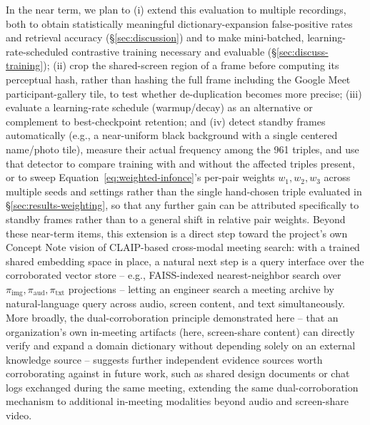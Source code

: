 ﻿\documentclass[twocolumn]{article}
\begin{document}
In the near term, we plan to (i) extend this evaluation to multiple recordings, both to obtain
statistically meaningful dictionary-expansion false-positive rates and retrieval accuracy
(\S\ref{sec:discussion}) and to make mini-batched, learning-rate-scheduled contrastive training
necessary and evaluable (\S\ref{sec:discuss-training}); (ii) crop the shared-screen region of a
frame before computing its perceptual hash, rather than hashing the full frame including the
Google Meet participant-gallery tile, to test whether de-duplication becomes more precise;
(iii) evaluate a learning-rate schedule (warmup/decay) as an alternative or complement to
best-checkpoint retention; and (iv) detect standby frames automatically (e.g., a near-uniform
black background with a single centered name/photo tile), measure their actual frequency among the
961 triples, and use that detector to compare training with and without the affected triples
present, or to sweep Equation~\ref{eq:weighted-infonce}'s per-pair weights $w_1, w_2, w_3$ across
multiple seeds and settings rather than the single hand-chosen triple evaluated in
\S\ref{sec:results-weighting}, so that any further gain can be attributed specifically to standby
frames rather than to a general shift in relative pair weights. Beyond these near-term items, this extension is a direct step toward the
project's own Concept Note vision of CLAIP-based cross-modal meeting search: with a trained shared
embedding space in place, a natural next step is a query interface over the corroborated
vector store -- e.g., FAISS-indexed nearest-neighbor search over
$\pi_{\text{img}}, \pi_{\text{aud}}, \pi_{\text{txt}}$ projections -- letting an engineer search a
meeting archive by natural-language query across audio, screen content, and text simultaneously.
More broadly, the dual-corroboration principle demonstrated here -- that an organization's own
in-meeting artifacts (here, screen-share content) can directly verify and expand a domain dictionary
without depending solely on an external knowledge source -- suggests further independent evidence
sources worth corroborating against in future work, such as shared design documents or chat logs
exchanged during the same meeting, extending the same dual-corroboration mechanism to additional
in-meeting modalities beyond audio and screen-share video.
\end{document}

